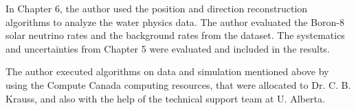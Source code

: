 In Chapter 6, the author used the position and direction reconstruction algorithms to analyze the water physics data. The author evaluated the Boron-8 solar neutrino rates and the background rates from the dataset. The systematics and uncertainties from Chapter 5 were evaluated and included in the results.

The author executed algorithms on data and simulation mentioned above by using the Compute Canada computing resources, that were
allocated to Dr. C. B. Krauss, and also with the help of the technical support team at U. Alberta.